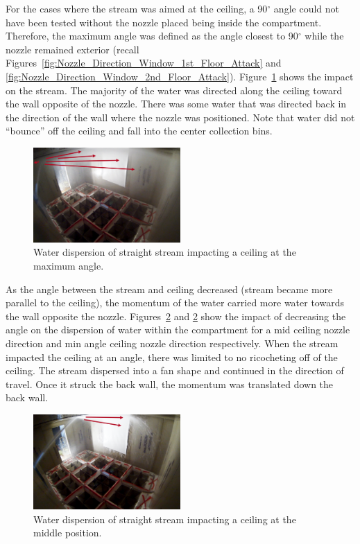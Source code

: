 \documentclass[12pt,oneside]{book}
\begin{document}
For the cases where the stream was aimed at the ceiling, a 90$^{\circ}$ angle could not have been tested without the nozzle placed being inside the compartment. Therefore, the maximum angle was defined as the angle closest to 90$^{\circ}$ while the nozzle remained exterior (recall Figures~\ref{fig:Nozzle_Direction_Window_1st_Floor_Attack} and \ref{fig:Nozzle_Direction_Window_2nd_Floor_Attack}). Figure~\ref{fig:MaxAngleCeilingImpact} shows the impact on the stream. The majority of the water was directed along the ceiling toward the wall opposite of the nozzle. There was some water that was directed back in the direction of the wall where the nozzle was positioned. Note that water did not ``bounce'' off the ceiling and fall into the center collection bins.

\begin{figure}[!ht]
\centering
\includegraphics[width=0.5\textwidth]{Figures/Water_Distribution/Nozzle_Directions/Exterior_MaxAngleCeiling_SS_Arrows} 
\caption[Water Dispersion Straight Stream Max Angle Ceiling]{Water dispersion of straight stream impacting a ceiling at the maximum angle.}
\label{fig:MaxAngleCeilingImpact}
\end{figure}

As the angle between the stream and ceiling decreased (stream became more parallel to the ceiling), the momentum of the water carried more water towards the wall opposite the nozzle. Figures~\ref{fig:MidCeilingImpact} and \ref{fig:MidCeilingImpact} show the impact of decreasing the angle on the dispersion of water within the compartment for a mid ceiling nozzle direction and min angle ceiling nozzle direction respectively. When the stream impacted the ceiling at an angle, there was limited to no ricocheting off of the ceiling. The stream dispersed into a fan shape and continued in the direction of travel. Once it struck the back wall, the momentum was translated down the back wall. 

\begin{figure}[!ht]
\centering
\includegraphics[width=0.5\textwidth]{Figures/Water_Distribution/Nozzle_Directions/Exterior_MidCeiling_SS_Arrows}
\caption[Water Dispersion Straight Stream Middle Position Ceiling]{Water dispersion of straight stream impacting a ceiling at the middle position.}
\label{fig:MidCeilingImpact}
\end{figure}
\end{document}
